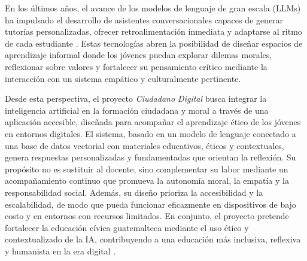 En los últimos años, el avance de los modelos de lenguaje de gran escala (LLMs)
ha impulsado el desarrollo de asistentes conversacionales capaces de generar
tutorías personalizadas, ofrecer retroalimentación inmediata y adaptarse al
ritmo de cada estudiante \cite{elstad2024ai,frontiers2025education}. Estas
tecnologías abren la posibilidad de diseñar espacios de aprendizaje informal
donde los jóvenes puedan explorar dilemas morales, reflexionar sobre valores y
fortalecer su pensamiento crítico mediante la interacción con un sistema
empático y culturalmente pertinente.

Desde esta perspectiva, el proyecto \textit{Ciudadano Digital} busca integrar la
inteligencia artificial en la formación ciudadana y moral a través de una
aplicación accesible, diseñada para acompañar el aprendizaje ético de los
jóvenes en entornos digitales. El sistema, basado en un modelo de lenguaje
conectado a una base de datos vectorial con materiales educativos, éticos y
contextuales, genera respuestas personalizadas y fundamentadas que orientan la
reflexión. Su propósito no es sustituir al docente, sino complementar su labor
mediante un acompañamiento continuo que promueva la autonomía moral, la empatía
y la responsabilidad social. Además, su diseño prioriza la accesibilidad y la
escalabilidad, de modo que pueda funcionar eficazmente en dispositivos de bajo
costo y en entornos con recursos limitados. En conjunto, el proyecto pretende
fortalecer la educación cívica guatemalteca mediante el uso ético y
contextualizado de la IA, contribuyendo a una educación más inclusiva,
reflexiva y humanista en la era digital
\cite{unesco2021ethics,worldbank2022revolution,rivas2023future}.
